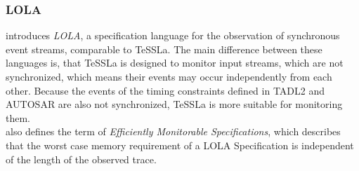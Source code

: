 	\subsubsection{LOLA}
		\cite{LOLA} introduces \textit{LOLA}, a specification language for the observation of synchronous event streams, comparable to TeSSLa. The main difference between these languages is, that TeSSLa is designed to monitor input streams, which are not synchronized, which means their events may occur independently from each other. Because the events of the timing constraints defined in TADL2 and AUTOSAR are also not synchronized, TeSSLa is more suitable for monitoring them.\\
		\cite{LOLA} also defines the term of \textit{Efficiently Monitorable Specifications}, which describes that the worst case memory requirement of a LOLA Specification is independent of the length of the observed trace.
	
